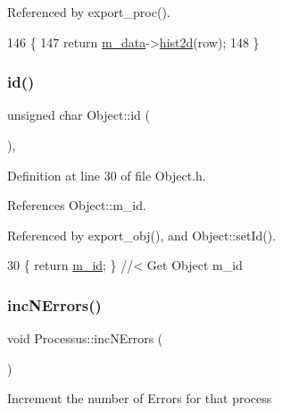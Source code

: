 Referenced by export\+\_\+proc().


\begin{DoxyCode}
146                                    \{
147     \textcolor{keywordflow}{return} \hyperlink{classProcessus_a3da9a9de8af54e2f47807a3e09dfccff}{m\_data}->\hyperlink{classData_ab717ebe242192605ad509b76df35e855}{hist2d}(row);
148   \}
\end{DoxyCode}
\mbox{\label{classObject_af99145335cc61ff6e2798ea17db009d2}} 
\subsubsection{\texorpdfstring{id()}{id()}}
{\footnotesize\ttfamily unsigned char Object\+::id (\begin{DoxyParamCaption}{ }\end{DoxyParamCaption})\hspace{0.3cm}{\ttfamily [inline]}, {\ttfamily [inherited]}}



Definition at line 30 of file Object.\+h.



References Object\+::m\+\_\+id.



Referenced by export\+\_\+obj(), and Object\+::set\+Id().


\begin{DoxyCode}
30 \{ \textcolor{keywordflow}{return} \hyperlink{classObject_aca74b9dbfed7b5556ea2d56c65b6b6b0}{m\_id};         \} \textcolor{comment}{//< Get Object m\_id }
\end{DoxyCode}
\mbox{\label{classProcessus_abe603d0636f76db6aa6c5c60cf34c591}} 
\subsubsection{\texorpdfstring{inc\+N\+Errors()}{incNErrors()}}
{\footnotesize\ttfamily void Processus\+::inc\+N\+Errors (\begin{DoxyParamCaption}{ }\end{DoxyParamCaption})\hspace{0.3cm}{\ttfamily [inherited]}}

Increment the number of Errors for that process 

